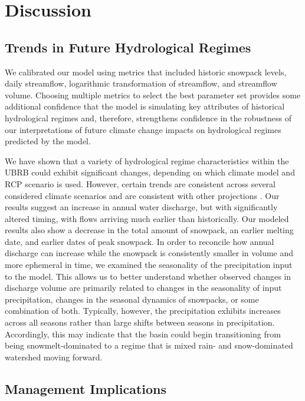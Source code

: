\documentclass[water,article,submit,moreauthors,pdftex,10pt,a4paper]{mdpi}
\theoremstyle{mdpi}
\newcounter{thm}
\newcounter{ex}
\newcounter{re}
\theoremstyle{mdpidefinition}
\begin{document}
\section{Discussion}

\subsection{Trends in Future Hydrological Regimes}

We calibrated our model using metrics that included historic snowpack levels, daily streamflow, logarithmic transformation of streamflow, and streamflow volume. Choosing multiple metrics to select the best parameter set provides some additional confidence that the model is simulating key attributes of historical hydrological regimes and, therefore, strengthens confidence in the robustness of our interpretations of future climate change impacts on hydrological regimes predicted by the model. 

We have shown that a variety of hydrological regime characteristics within the UBRB could exhibit significant changes, depending on which climate model and RCP scenario is used. However, certain trends are consistent across several considered climate scenarios and are consistent with other projections \citep{Adam:2009ie,Inouye:2014ws,Gergel:2017vj}. Our results suggest an increase in annual water discharge, but with significantly altered timing, with flows arriving much earlier than historically. Our modeled results also show a decrease in the total amount of snowpack, an earlier melting date, and earlier dates of peak snowpack. In order to reconcile how annual discharge can increase while the snowpack is consistently smaller in volume and more ephemeral in time, we examined the seasonality of the precipitation input to the model. This allows us to better understand whether observed changes in discharge volume are primarily related to changes in the seasonality of input precipitation, changes in the seasonal dynamics of snowpacks, or some combination of both. Typically, however, the precipitation exhibits increases across all seasons rather than large shifts between seasons in precipitation. Accordingly, this may indicate that the basin could begin transitioning from being snowmelt-dominated to a regime that is mixed rain- and snow-dominated watershed moving forward.

\subsection{Management Implications}
\end{document}
